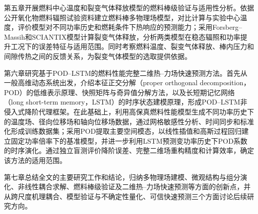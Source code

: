 第五章开展燃料中心温度和裂变气体释放模型的燃料棒级验证与适用性分析。依据公开氧化物燃料辐照试验资料建立燃料棒多物理场模型，对比计算与实验中心温度，评价模型对不同功率历史和燃耗条件下热响应的预测能力；采用Forsberg--Massih和SCIANTIX模型计算裂变气体释放，分析两类模型在稳态辐照和功率提升工况下的误差特征与适用范围。同时考察燃料温度、裂变气体释放、棒内压力和间隙传热之间的反馈关系，为裂变气体模型的选取提供依据。

第六章研究基于POD--LSTM的燃料性能完整二维热--力场快速预测方法。首先从一般高维动态系统出发，介绍本征正交分解（proper orthogonal decomposition，POD）的低维表示原理、快照矩阵与奇异值分解方法，以及长短期记忆网络（long short-term memory，LSTM）的时序状态建模原理，形成POD--LSTM非侵入式降阶代理框架。在此基础上，利用高保真燃料性能模型生成不同功率历史下的温度场、径向位移场和轴向位移场数据，通过网格敏感性分析、时间同步和标准化形成训练数据集；采用POD提取主要空间模态，以线性插值和高斯过程回归建立固定功率倍率下的基准模型，并进一步利用LSTM预测变功率历史下POD系数的时序演化。通过独立盲测评价降阶误差、完整二维场重构精度和计算效率，确定该方法的适用范围。

第七章总结全文的主要研究工作和结论，归纳多物理场建模、微观结构与组分演化、非线性耦合求解、燃料棒级验证及二维热--力场快速预测等方面的创新点，并从跨尺度机理耦合、模型验证与不确定性量化、可信快速预测三个方面讨论后续研究方向。
